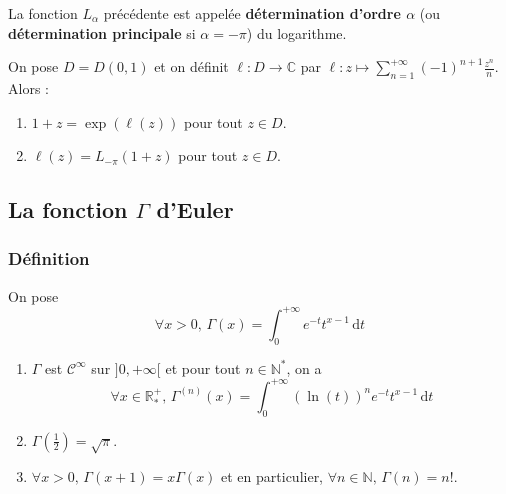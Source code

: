   \begin{definition}
    La fonction $L_\alpha$ précédente est appelée \textbf{détermination d'ordre $\alpha$} (ou \textbf{détermination principale} si $\alpha = -\pi$) du logarithme.
  \end{definition}

  \begin{theorem}
    On pose $D = D(0,1)$ et on définit $\ell : D \rightarrow \mathbb{C}$ par $\ell : z \mapsto \sum_{n=1}^{+\infty} (-1)^{n+1} \frac{z^n}{n}$. Alors :
    \begin{enumerate}[label=(\roman*)]
      \item $1 + z = \exp(\ell(z))$ pour tout $z \in D$.
      \item $\ell(z) = L_{-\pi}(1+z)$ pour tout $z \in D$.
    \end{enumerate}
  \end{theorem}

  \subsection{La fonction \texorpdfstring{$\Gamma$}{Gamma} d'Euler}

  \subsubsection{Définition}


  \begin{definition}
    On pose
    \[ \forall x > 0, \, \Gamma(x) = \int_0^{+\infty} e^{-t} t^{x-1} \, \mathrm{d}t \]
  \end{definition}

  \begin{proposition}
    \begin{enumerate}[label=(\roman*)]
      \item $\Gamma$ est $\mathcal{C}^\infty$ sur $]0, +\infty[$ et pour tout $n \in \mathbb{N}^*$, on a
      \[ \forall x \in \mathbb{R}_*^+, \, \Gamma^{(n)}(x) = \int_{0}^{+\infty} (\ln(t))^n e^{-t} t^{x-1} \, \mathrm{d}t \]
      \item $\Gamma \left( \frac{1}{2} \right) = \sqrt{\pi}$.
      \item $\forall x > 0, \, \Gamma(x+1) = x \Gamma(x)$ et en particulier, $\forall n \in \mathbb{N}, \, \Gamma(n) = n!$.
    \end{enumerate}
  \end{proposition}

